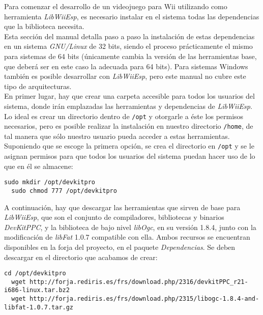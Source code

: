 
Para comenzar el desarrollo de un videojuego para Wii utilizando como herramienta \emph{LibWiiEsp}, es necesario instalar en el sistema todas las dependencias que la biblioteca necesita. \\

Esta sección del manual detalla paso a paso la instalación de estas dependencias en un sistema \emph{GNU/Linux} de 32 bits, siendo el proceso prácticamente el mismo para sistemas de 64 bits (únicamente cambia la versión de las herramientas base, que deberá ser en este caso la adecuada para 64 bits). Para sistemas Windows también es posible desarrollar con \emph{LibWiiEsp}, pero este manual no cubre este tipo de arquitecturas. \\

En primer lugar, hay que crear una carpeta accesible para todos los usuarios del sistema, donde irán emplazadas las herramientas y dependencias de \emph{LibWiiEsp}. Lo ideal es crear un directorio dentro de \texttt{/opt} y otorgarle a éste los permisos necesarios, pero es posible realizar la instalación en nuestro directorio \texttt{/home}, de tal manera que sólo nuestro usuario pueda acceder a estas herramientas. \\

Suponiendo que se escoge la primera opción, se crea el directorio en \texttt{/opt} y se le asignan permisos para que todos los usuarios del sistema puedan hacer uso de lo que en él se almacene:

\begin{lstlisting}[style=consola]
  sudo mkdir /opt/devkitpro
  sudo chmod 777 /opt/devkitpro
\end{lstlisting}

A continuación, hay que descargar las herramientas que sirven de base para \emph{LibWiiEsp}, que son el conjunto de compiladores, bibliotecas y binarios \emph{DevKitPPC}, y la biblioteca de bajo nivel \emph{libOgc}, en su versión 1.8.4, junto con la modificación de \emph{libFat} 1.0.7 compatible con ella. Ambos recursos se encuentran disponibles en la forja del proyecto, en el paquete \emph{Dependencias}. Se deben descargar en el directorio que acabamos de crear:

\begin{lstlisting}[style=consola]
  cd /opt/devkitpro
  wget http://forja.rediris.es/frs/download.php/2316/devkitPPC_r21-i686-linux.tar.bz2
  wget http://forja.rediris.es/frs/download.php/2315/libogc-1.8.4-and-libfat-1.0.7.tar.gz
\end{lstlisting}

